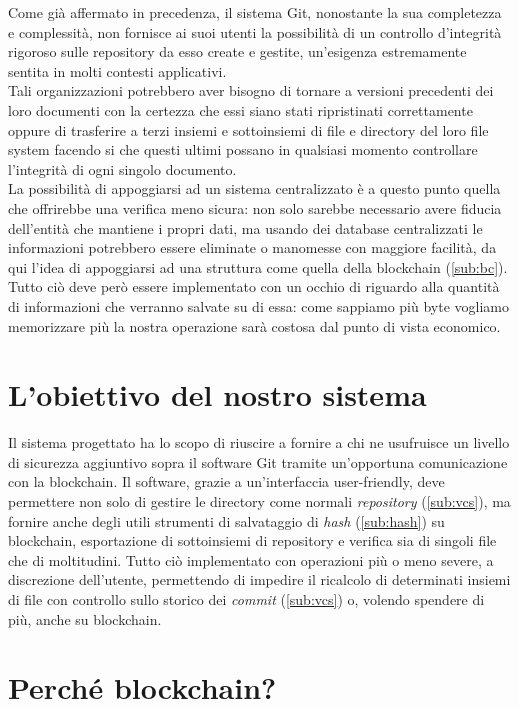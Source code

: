 
Come già affermato in precedenza, il sistema Git,
nonostante la sua completezza e complessità,
non fornisce ai suoi utenti la possibilità di un controllo d'integrità rigoroso
sulle repository da esso create e gestite, un'esigenza estremamente
sentita in molti contesti applicativi. \\
Tali organizzazioni potrebbero aver bisogno di tornare a versioni precedenti
dei loro documenti con la certezza che essi siano stati ripristinati
correttamente oppure di trasferire a terzi insiemi e sottoinsiemi
di file e directory del loro file system facendo si che questi ultimi
possano in qualsiasi momento controllare l'integrità di ogni singolo documento. \\
La possibilità di appoggiarsi ad un sistema centralizzato è a questo punto quella
che offrirebbe una verifica meno sicura: non solo sarebbe necessario avere fiducia
dell'entità che mantiene i propri dati, ma usando dei database centralizzati le informazioni
potrebbero essere eliminate o manomesse con maggiore facilità,
da qui l'idea di appoggiarsi ad una struttura come quella della blockchain (\autoref{sub:bc}).
Tutto ciò deve però essere implementato con un occhio di riguardo alla quantità
di informazioni che verranno salvate su di essa: come sappiamo più byte vogliamo
memorizzare più la nostra operazione sarà costosa dal punto di vista economico.

\section{L'obiettivo del nostro sistema}

Il sistema progettato ha lo scopo di riuscire a fornire a chi ne usufruisce
un livello di sicurezza aggiuntivo sopra il software Git tramite un'opportuna
comunicazione con la blockchain.
Il software, grazie a un'interfaccia user-friendly, deve permettere non solo di gestire
le directory come normali \emph{repository} (\autoref{sub:vcs}), ma fornire
anche degli utili strumenti di salvataggio di \emph{hash} (\autoref{sub:hash}) su blockchain,
esportazione di sottoinsiemi di repository
e verifica sia di singoli file che di moltitudini.
Tutto ciò implementato con operazioni più o meno severe, a discrezione dell'utente,
permettendo di impedire il ricalcolo di determinati insiemi di file con controllo
sullo storico dei \emph{commit} (\autoref{sub:vcs}) o, volendo spendere di più, anche su blockchain.

\section{Perché blockchain?}

